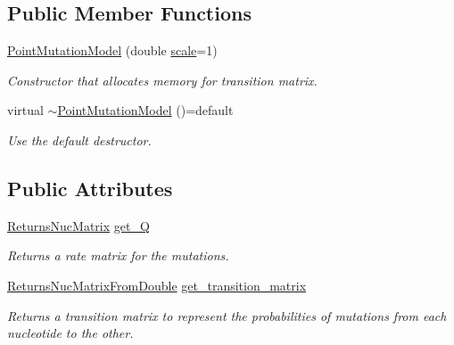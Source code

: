\subsection*{Public Member Functions}
\begin{DoxyCompactItemize}
\item 
\mbox{\label{classretrocombinator_1_1PointMutationModel_a4c83f671b3d76f8cf39ae5b5a1be658e}} 
\hyperlink{classretrocombinator_1_1PointMutationModel_a4c83f671b3d76f8cf39ae5b5a1be658e}{Point\+Mutation\+Model} (double \hyperlink{classretrocombinator_1_1PointMutationModel_a3258dfbdae0f2614cdc66f13ae028b46}{scale}=1)
\begin{DoxyCompactList}\small\item\em Constructor that allocates memory for transition matrix. \end{DoxyCompactList}\item 
virtual \hyperlink{classretrocombinator_1_1PointMutationModel_a86a21482afab3faa92b5b05153c92915}{$\sim$\+Point\+Mutation\+Model} ()=default
\begin{DoxyCompactList}\small\item\em Use the default destructor. \end{DoxyCompactList}\end{DoxyCompactItemize}
\subsection*{Public Attributes}
\begin{DoxyCompactItemize}
\item 
\hyperlink{namespaceretrocombinator_a9556122795cc5d0307ae7d2f4e5c36ef}{Returns\+Nuc\+Matrix} \hyperlink{classretrocombinator_1_1PointMutationModel_a6c6e94bfbf16c3893068e3db1597e941}{get\+\_\+Q}
\begin{DoxyCompactList}\small\item\em Returns a rate matrix for the mutations. \end{DoxyCompactList}\item 
\hyperlink{namespaceretrocombinator_a8c467e58c8e3e2f58b916ac063c671b1}{Returns\+Nuc\+Matrix\+From\+Double} \hyperlink{classretrocombinator_1_1PointMutationModel_a5f17e2f93b22723721a4d04ac2c77aaa}{get\+\_\+transition\+\_\+matrix}
\begin{DoxyCompactList}\small\item\em Returns a transition matrix to represent the probabilities of mutations from each nucleotide to the other. \end{DoxyCompactList}\end{DoxyCompactItemize}
